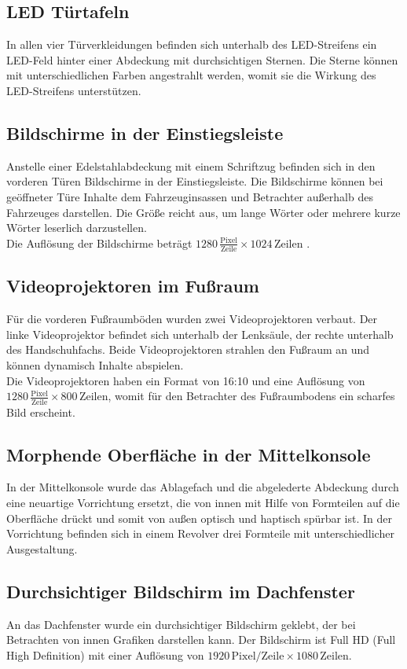 \subsection{LED Türtafeln}
In allen vier Türverkleidungen befinden sich unterhalb des LED-Streifens ein LED-Feld hinter einer Abdeckung mit durchsichtigen Sternen. Die Sterne können mit unterschiedlichen Farben angestrahlt werden, womit sie die Wirkung des LED-Streifens unterstützen.
\subsection{Bildschirme in der Einstiegsleiste}
Anstelle einer Edelstahlabdeckung mit einem Schriftzug befinden sich in den vorderen Türen Bildschirme in der Einstiegsleiste. Die Bildschirme können bei geöffneter Türe Inhalte dem Fahrzeuginsassen und Betrachter außerhalb des Fahrzeuges darstellen. Die Größe reicht aus, um lange Wörter oder mehrere kurze Wörter leserlich darzustellen. \\
Die Auflösung der Bildschirme beträgt $ 1280 \,\frac{\mathrm{Pixel}}{\mathrm{Zeile}} \times 1024 \,\mathrm{Zeilen} $ . 
\subsection{Videoprojektoren im Fußraum}
Für die vorderen Fußraumböden wurden zwei Videoprojektoren verbaut. Der linke Videoprojektor befindet sich unterhalb der Lenksäule, der rechte unterhalb des Handschuhfachs. Beide Videoprojektoren strahlen den Fußraum an und können dynamisch Inhalte abspielen. \\
Die Videoprojektoren haben ein Format von 16:10 und eine Auflösung von $ 1280\,\frac{\mathrm{Pixel}}{\mathrm{Zeile}}\times 800\,\mathrm{Zeilen} $, womit für den Betrachter des Fußraumbodens ein scharfes Bild erscheint.
\subsection{Morphende Oberfläche in der Mittelkonsole}
In der Mittelkonsole wurde das Ablagefach und die abgelederte Abdeckung durch eine neuartige Vorrichtung ersetzt, die von innen mit Hilfe von Formteilen auf die Oberfläche drückt und somit von außen optisch und haptisch spürbar ist. In der Vorrichtung befinden sich in einem Revolver drei Formteile mit unterschiedlicher Ausgestaltung.
\subsection{Durchsichtiger Bildschirm im Dachfenster}
An das Dachfenster wurde ein durchsichtiger Bildschirm geklebt, der bei Betrachten von innen Grafiken darstellen kann.
Der Bildschirm ist Full HD (Full High Definition) mit einer Auflösung von $ 1920 \,\mathrm{Pixel}/\mathrm{Zeile} \times 1080 \,\mathrm{Zeilen} $.

